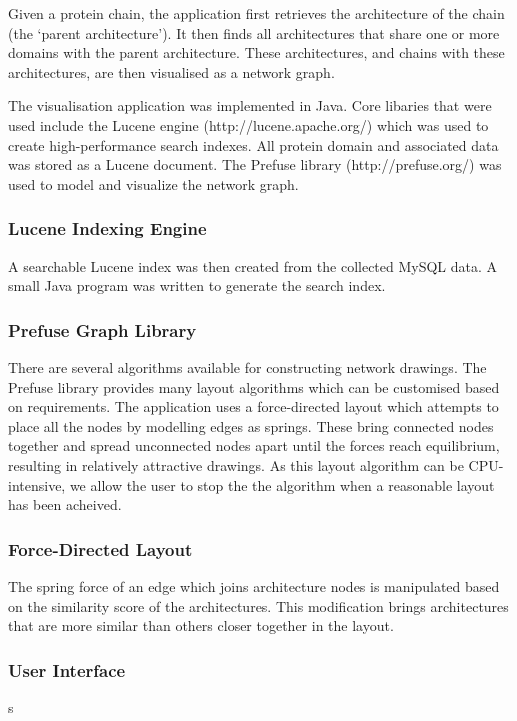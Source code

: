 Given a protein chain, the application first retrieves the architecture of the chain (the `parent architecture'). It then finds all architectures that share one or more domains with the parent architecture.  These architectures, and chains with these architectures, are then visualised as a network graph.

The visualisation application was implemented in Java. Core libaries that were used include the Lucene engine (http://lucene.apache.org/) which was used to create high-performance search indexes. All protein domain and associated data was stored as a Lucene document. The Prefuse library (http://prefuse.org/) was used to model and visualize the network graph.

\subsubsection{Lucene Indexing Engine}
A searchable Lucene index was then created from the collected MySQL data. A small Java program was written to generate the search index. 

\subsubsection{Prefuse Graph Library}
There are several algorithms available for constructing network drawings. The Prefuse library provides many layout algorithms which can be customised based on requirements. The application uses a force-directed layout \cite{force} which attempts to place all the nodes by modelling edges as springs. These bring connected nodes together and spread unconnected nodes apart until the forces reach equilibrium, resulting in relatively attractive drawings. As this layout algorithm can be CPU-intensive, we allow the user to stop the the algorithm when a reasonable layout has been acheived.
\subsubsection{Force-Directed Layout}
The spring force of an edge which joins architecture nodes is manipulated based on the similarity score of the architectures. This modification brings architectures that are more similar than others closer together in the layout. 
\subsubsection{User Interface}
s


